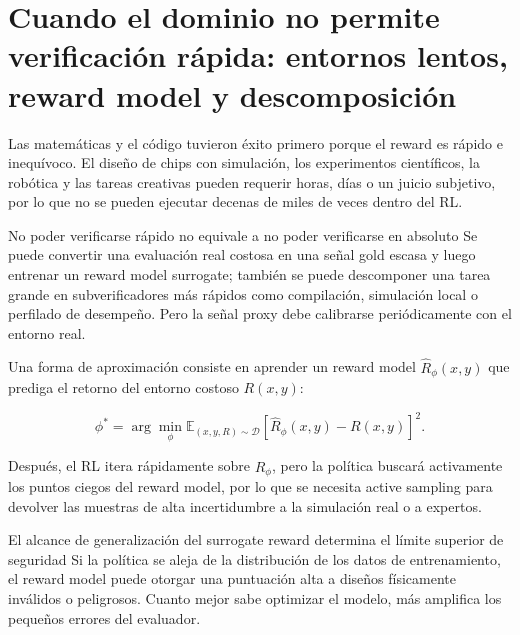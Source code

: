 \section{Cuando el dominio no permite verificación rápida: entornos lentos, reward model y descomposición}


Las matemáticas y el código tuvieron éxito primero porque el reward es rápido e inequívoco. El diseño de chips con simulación, los experimentos científicos, la robótica y las tareas creativas pueden requerir horas, días o un juicio subjetivo, por lo que no se pueden ejecutar decenas de miles de veces dentro del RL.

\begin{importantbox}{No poder verificarse rápido no equivale a no poder verificarse en absoluto}
Se puede convertir una evaluación real costosa en una señal gold escasa y luego entrenar un reward model surrogate; también se puede descomponer una tarea grande en subverificadores más rápidos como compilación, simulación local o perfilado de desempeño. Pero la señal proxy debe calibrarse periódicamente con el entorno real.
\end{importantbox}

Una forma de aproximación consiste en aprender un reward model $\hat R_\phi(x,y)$ que prediga el retorno del entorno costoso $R(x,y)$:

$$
\phi^*=\arg\min_\phi
\mathbb E_{(x,y,R)\sim \mathcal D}
\left[\hat R_\phi(x,y)-R(x,y)\right]^2.
$$

Después, el RL itera rápidamente sobre $\hat R_\phi$, pero la política buscará activamente los puntos ciegos del reward model, por lo que se necesita active sampling para devolver las muestras de alta incertidumbre a la simulación real o a expertos.

\begin{warningbox}{El alcance de generalización del surrogate reward determina el límite superior de seguridad}
Si la política se aleja de la distribución de los datos de entrenamiento, el reward model puede otorgar una puntuación alta a diseños físicamente inválidos o peligrosos. Cuanto mejor sabe optimizar el modelo, más amplifica los pequeños errores del evaluador.
\end{warningbox}

